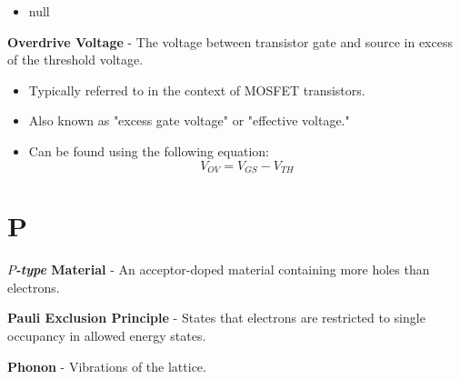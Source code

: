     \vspace{0.15cm}
    \begin{itemize}
        \setlength\itemsep{0.5em}
        \item{null}
    \end{itemize}
\vspace{0.5cm}
    \textbf{Overdrive Voltage} - The voltage between transistor gate and source in excess of the threshold voltage.
    \vspace{0.15cm}
    \begin{itemize}
        \setlength\itemsep{0.5em}
        \item{Typically referred to in the context of MOSFET transistors.}
        \item{Also known as "excess gate voltage" or "effective voltage."}
        \item{Can be found using the following equation:}
        \begin{equation}
            V_{OV} = V_{GS} - V_{TH}
        \end{equation}
    \end{itemize}
\section{P}
    \textbf{$P$\emph{-type} Material} - An acceptor-doped material containing more holes than electrons.

\vspace{0.5cm}
\noindent
    \textbf{Pauli Exclusion Principle} - States that electrons are restricted to single occupancy in allowed energy states.

\vspace{0.5cm}
\noindent
    \textbf{Phonon} - Vibrations of the lattice.
